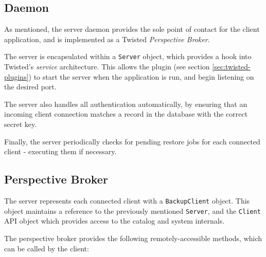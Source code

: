 \subsection{Daemon}

As mentioned, the server daemon provides the sole point of contact for the
client application, and is implemented as a Twisted \emph{Perspective Broker}.

The server is encapsulated within a \verb!Server! object, which provides a hook
into Twisted's \emph{service} architecture. This allows the plugin (see section
\ref{sec:twisted-plugins}) to start the server when the application is run, and
begin listening on the desired port.

The server also handles all authentication automatically, by ensuring that
an incoming client connection matches a record in the database with the correct
secret key.

Finally, the server periodically checks for pending restore jobs for each
connected client - executing them if necessary.

\subsection{Perspective Broker}

The server represents each connected client with a \verb!BackupClient! object.
This object maintains a reference to the previously mentioned \verb!Server!,
and the \verb!Client! API object which provides access to the catalog and
system internals.

The perspective broker provides the following remotely-accessible methods,
which can be called by the client:

